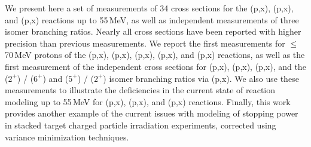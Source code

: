 We present here a set of measurements of 34 cross sections for the (p,x), (p,x), and  (p,x) reactions up to 55\,MeV, as well as  independent measurements of three isomer branching ratios.
Nearly all cross sections have been reported with higher precision than previous measurements.
We report the first measurements  for $\leq$70\,MeV protons  of the  (p,x), (p,x), (p,x),  (p,x), and (p,x) reactions, as well as the first measurement of the independent cross sections for    (p,x), (p,x), (p,x), and the  ($2^+$) /   ($6^+$) and  ($5^+$) /   ($2^+$)  isomer branching ratios via (p,x).
We also use these measurements to illustrate the deficiencies in the current state of  reaction modeling up to 55\,MeV for  (p,x), (p,x), and  (p,x) reactions.
Finally, this work provides another example of the current issues with modeling of  stopping power in stacked target charged particle irradiation experiments, corrected using variance minimization techniques.  
